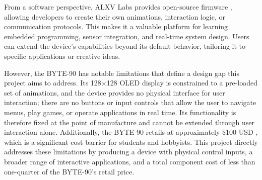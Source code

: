 \begin{sloppypar}
    From a software perspective, ALXV Labs provides open-source firmware \cite{byte90_firmware}, allowing developers to create their own animations, interaction logic, or communication protocols. This makes it a valuable platform for learning embedded programming, sensor integration, and real-time system design. Users can extend the device's capabilities beyond its default behavior, tailoring it to specific applications or creative ideas.
\end{sloppypar}

However, the BYTE-90 has notable limitations that define a design gap this project aims to address. Its 128$\times$128 OLED display is constrained to a pre-loaded set of animations, and the device provides no physical interface for user interaction; there are no buttons or input controls that allow the user to navigate menus, play games, or operate applications in real time. Its functionality is therefore fixed at the point of manufacture and cannot be extended through user interaction alone. Additionally, the BYTE-90 retails at approximately \$100 USD \cite{byte90_alxv}, which is a significant cost barrier for students and hobbyists. This project directly addresses these limitations by producing a device with physical control inputs, a broader range of interactive applications, and a total component cost of less than one-quarter of the BYTE-90's retail price.